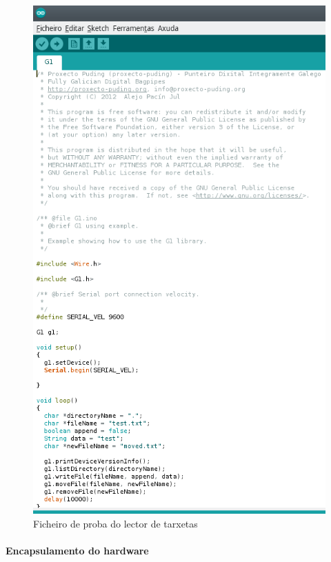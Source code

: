   \begin{figure}[htbp]
    \centering
    \includegraphics[scale=0.8,keepaspectratio=true]{./imagenes/test-lector-tarxetas.png}
    \caption{Ficheiro de proba do lector de tarxetas}
    \label{figura:TestLectorTarxetas}
   \end{figure}

   \paragraph{Encapsulamento do hardware}
   
